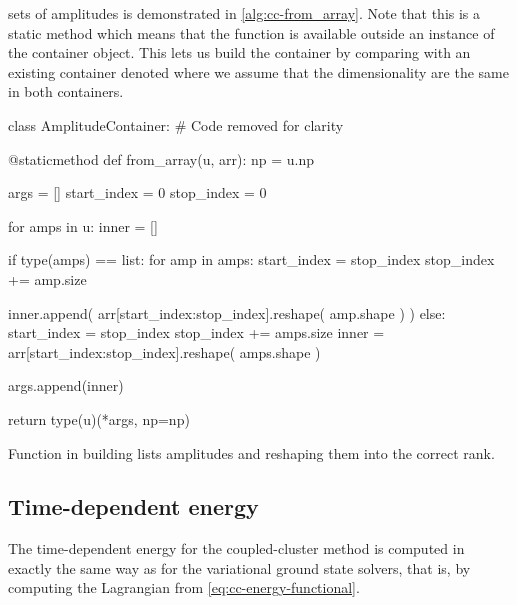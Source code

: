             sets of amplitudes is demonstrated in \autoref{alg:cc-from_array}.
            Note that this is a static method which means that the function is
            available outside an instance of the container object.
            This lets us build the container by comparing with an existing
            container denoted  where we assume that the dimensionality
            are the same in both containers.
            \begin{algorithm}
                \begin{python}
class AmplitudeContainer:
    # Code removed for clarity

    @staticmethod
    def from_array(u, arr):
        np = u.np

        args = []
        start_index = 0
        stop_index = 0

        for amps in u:
            inner = []

            if type(amps) == list:
                for amp in amps:
                    start_index = stop_index
                    stop_index += amp.size

                    inner.append(
                        arr[start_index:stop_index].reshape(
                            amp.shape
                        )
                    )
            else:
                start_index = stop_index
                stop_index += amps.size
                inner = arr[start_index:stop_index].reshape(
                    amps.shape
                )

            args.append(inner)

        return type(u)(*args, np=np)
                \end{python}
                \caption{Function in  building lists
                amplitudes and reshaping them into the correct rank.}
                \label{alg:cc-from_array}
            \end{algorithm}

        \subsection{Time-dependent energy}
            The time-dependent energy for the coupled-cluster method is computed
            in exactly the same way as for the variational ground state solvers,
            that is, by computing the Lagrangian from
            \autoref{eq:cc-energy-functional}.

